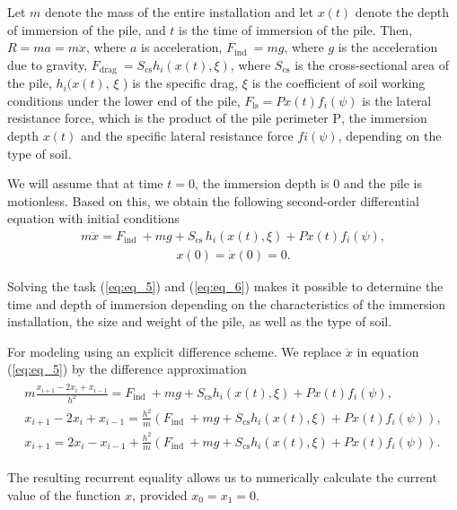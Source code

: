 \documentclass[
11pt,%
tightenlines,%
twoside,%
onecolumn,%
nofloats,%
nobibnotes,%
nofootinbib,%
superscriptaddress,%
noshowpacs,%
centertags]%
{revtex4}
\begin{document}
Let $m$ denote the mass of the entire installation and let  $x(t)$
denote the depth of immersion of the pile, and $t$ is the time of
immersion of the pile. Then, $R=m a=m \ddot{x}$, where $a$ is
acceleration, $F_{\text {ind }}=m g$, where $g$ is the acceleration
due to gravity, $F_{\text {drag }}=S_{\mathrm{cs}} h_{i}(x(t),
\xi)$, where $S_{\mathrm{cs}}$ is the cross-sectional area of the
pile, $h_{i}(x(t)$, $\xi$ ) is the specific drag, $\xi$ is the
coefficient of soil working conditions under the lower end of the
pile, $F_{\mathrm{ls}}=P x(t) f_{i}(\psi)$ is the lateral resistance
force, which is the product of the pile perimeter $\mathrm{P}$, the
immersion depth $x(t)$ and the specific lateral resistance force $f
i(\psi)$, depending on the type of soil.

We will assume that at time $t=0$, the immersion depth  is 0 and the
pile is motionless. Based on this, we obtain the following
second-order differential equation with initial conditions
\begin{eqnarray}
m \ddot{x}=F_{\text {ind }}+m g+S_{\mathrm{cs}} \, h_{i}(x(t),
\xi)+P x(t) f_{i}(\psi), \label{eq:eq_5}
\end{eqnarray}
\begin{eqnarray}
x(0)=\dot{x}(0)=0. \label{eq:eq_6}
\end{eqnarray}

Solving the task (\ref{eq:eq_5}) and (\ref{eq:eq_6}) makes it
possible to determine the time and depth of immersion depending on
the characteristics of the immersion installation, the size and
weight of the pile, as well as the type of soil.

For modeling using an explicit  difference scheme. We replace
$\ddot{x}$ in equation (\ref{eq:eq_5}) by the difference
approximation
\begin{eqnarray}
\begin{gathered}
m \frac{x_{i+1}-2 x_{i}+x_{i-1}}{h^{2}}=F_{\text {ind }}+m g+S_{\mathrm{cs}}
h_{i}(x(t), \xi)+P x(t) f_{i}(\psi), \\
x_{i+1}-2 x_{i}+x_{i-1}=\frac{h^{2}}{m}\left(F_{\text {ind }}+m g+S_{\mathrm{cs}} h_{i}(x(t), \xi)+P x(t) f_{i}(\psi)\right), \\
x_{i+1}=2 x_{i}-x_{i-1}+\frac{h^{2}}{m}\left(F_{\text {ind }}+m g+S_{\mathrm{cs}} h_{i}(x(t), \xi)+P x(t) f_{i}(\psi)\right) .
\end{gathered}
\label{eq:eq_7}
\end{eqnarray}

The resulting recurrent equality allows us  to numerically calculate
the current value of the function $x$, provided $x_{0}=x_{1}=0$.
\end{document}

